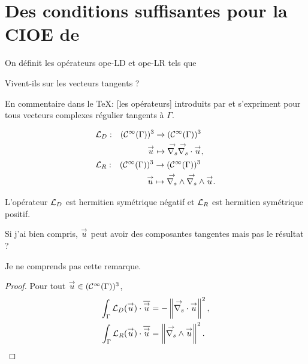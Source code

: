 \section[Des CSU pour la CIOE de Marceaux 2000]{Des conditions suffisantes pour la CIOE de \cite{marceaux_high-order_2000}}


  \begin{defn}
    On définit les opérateurs \gls{ope-LD} et \gls{ope-LR} tels que %

    \begin{REM}
      Vivent-ils sur les vecteurs tangents ?
    \end{REM}
    \begin{REP}
      En commentaire dans le \TeX : [les opérateurs] introduits par \cite[eq.~4]{stupfel_implementation_2015} et s'expriment pour tous vecteurs complexes régulier tangents à \(\Gamma\).
    \end{REP}

    \begin{equation*}
      \begin{aligned}
        &\fonction{\LD}{(\mathcal{C}^\infty(\Gamma))^3}{(\mathcal{C}^\infty(\Gamma))^3}%
          {\vu}{\vgrads{\vdivs \vu},}
        \\
        &\fonction{\LR}{(\mathcal{C}^\infty(\Gamma))^3}{(\mathcal{C}^\infty(\Gamma))^3}%
          {\vu}{\vrots{\vrots \vu}.}
      \end{aligned}
    \end{equation*}
  \end{defn}

  \begin{prop}
    L'opérateur \({\mathcal{L}_D}\) est hermitien symétrique négatif et \({\mathcal{L}_R}\) est hermitien symétrique positif.
  \end{prop}

  \begin{REM}
    Si j'ai bien compris, \({\overset{\rightarrow}{u}}\) peut avoir des composantes tangentes mais pas le résultat ?
  \end{REM}
  \begin{REP}
    Je ne comprends pas cette remarque.
  \end{REP}

  \begin{proof}
    Pour tout \({\overset{\rightarrow}{u}} \in (\mathcal C^\infty(\Gamma))^3\),
    \begin{align*}
      \int_\Gamma {\mathcal{L}_D}({\overset{\rightarrow}{u}})\cdot {\overline{{\overset{\rightarrow}{u}}}} &= -\left\lVert{\overset{\rightarrow}{\nabla_s}} \cdot {\overset{\rightarrow}{u}}\right\rVert^2,
      \\
      \int_\Gamma {\mathcal{L}_R}({\overset{\rightarrow}{u}})\cdot {\overline{{\overset{\rightarrow}{u}}}} &=\left\lVert {\overset{\rightarrow}{\nabla_s}} \wedge {\overset{\rightarrow}{u}}\right\rVert^2.
    \end{align*}
  \end{proof}

